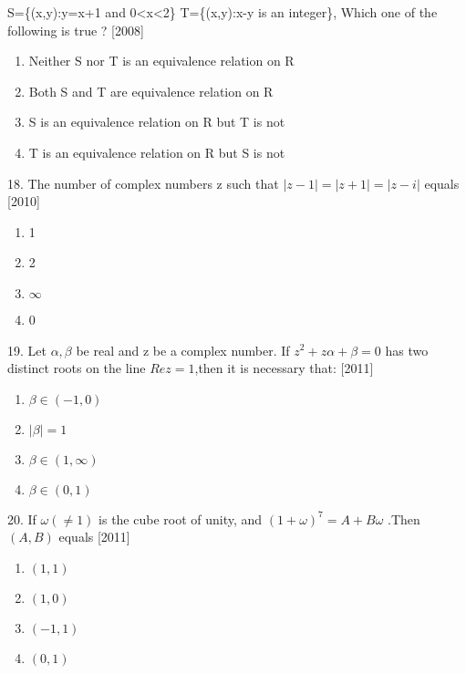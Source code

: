 \documentclass[journal,12pt,twocolumn]{IEEEtran}
\theoremstyle{remark}
\begin{document}
\begin{ducument}
S=\{(x,y):y=x+1 and 0<x<2\}
T=\{(x,y):x-y is an integer\},
Which one of the following is true ?
\hfill{\color{magenta}[2008]}
\begin{multicols}{1}
\begin{enumerate}
\item Neither S nor T is an equivalence relation on R
\item Both S and T are equivalence relation on R
\item S is an equivalence relation on R but T is not
\item T is an equivalence relation on R but S is not
\end{enumerate}
\end{multicols}
\item 18. The number of complex numbers z such that $|z-1|=|z+1|=|z-i|$ equals
\hfill{\color{magenta} [2010]}
\begin{multicols}{4}
\begin{enumerate}
\item 1
\item 2
\item $\infty$
\item 0
\end{enumerate}
\end{multicols}
\item 19. Let $\alpha,\beta$ be real and z be a complex number. If $z^2 +z\alpha +\beta =0$  has two distinct roots on the line $Rez=1$,then it is necessary that:
\hfill{\color{magenta}[2011]}
\begin{multicols}{2}
\begin{enumerate}
\item $\beta \in (-1,0)$
\item $|\beta|=1$
\item $\beta\in (1,\infty)$
\item $\beta\in (0,1)$
\end{enumerate}
\end{multicols}
\item 20. If $\omega(\neq1)$ is the cube root of unity, and $\left(1+\omega \right)^7= A+ B\omega$ .Then $(A,B)$ equals
\hfill{\color{magenta}[2011]}
\begin{multicols}{2}
\begin{enumerate}
\item $(1,1)$
\item $(1,0)$
\item $(-1,1)$
\item $(0,1)$
\end{enumerate}

\end{multicols}
\end{ducument}
\end{document}
